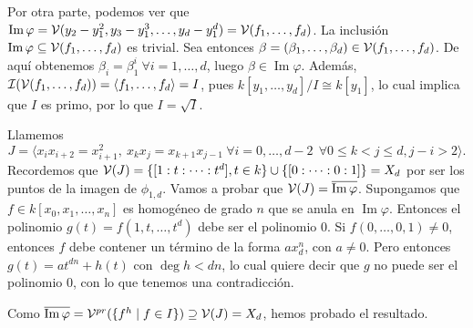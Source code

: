\documentclass[twoside]{article}
\DeclareMathOperator{\Ima}{Im}
\begin{document}
\begin{solucion}
\begin{enumerate}
Por otra parte, podemos ver que $\Ima\varphi=\V(y_2-y_1^2, y_3-y_1^3,\dots, y_d-y_1^d)=\V(f_1,\dots,f_d)$. La inclusión $\Ima\varphi\subseteq \V(f_1,\dots,f_d)$ es trivial. Sea entonces $\beta=(\beta_1,\dots,\beta_d)\in\mathcal{V}(f_1,\dots,f_d)$. De aquí obtenemos $\beta_i=\beta_1^i\ \forall i=1,\dots, d$, luego $\beta\in\Ima\varphi$.
Además, $\mathcal{I}(\mathcal{V}(f_1,\dots,f_d))=\langle f_1,\dots,f_d\rangle=I$, pues $k[y_1,\dots,y_d]/I\cong k[y_1]$, lo cual implica que $I$ es primo, por lo que $I=\sqrt{I}$. 

Llamemos $$J=\langle x_ix_{i+2}=x_{i+1}^2,\ x_kx_j=x_{k+1}x_{j-1}\ \forall i=0,\dots,d-2\ \ \forall 0\leq k< j\leq d, j-i>2 \rangle.$$ %
Recordemos que $\mathcal{V}(J)=\{[1:t:\dots:t^d], t\in k\}\cup\{[0:\dots:0:1]\}=X_d$ por ser los puntos de la imagen de $\phi_{1,d}$. Vamos a probar que $\V(J)=\overline{\Ima\varphi}$. Supongamos que $f\in k[x_0,x_1,\dots, x_n]$ es homogéneo de grado $n$ que se anula en $\Ima\varphi$. Entonces el polinomio $g(t)=f(1,t,\dots,t^d)$ debe ser el polinomio 0. Si $f(0,\dots,0,1)\neq 0$, entonces $f$ debe contener un término de la forma $ax_d^n$, con $a\neq 0$. Pero entonces $g(t)=at^{dn}+h(t)$ con $\deg h<dn$, lo cual quiere decir que $g$ no puede ser el polinomio 0, con lo que tenemos una contradicción. 

Como $\overline{\Ima\varphi}=\V^{pr}(\{f^h\mid f\in I\})\supseteq\V(J)=X_d$, hemos probado el resultado.


\end{enumerate}
\end{solucion}
\end{document}
